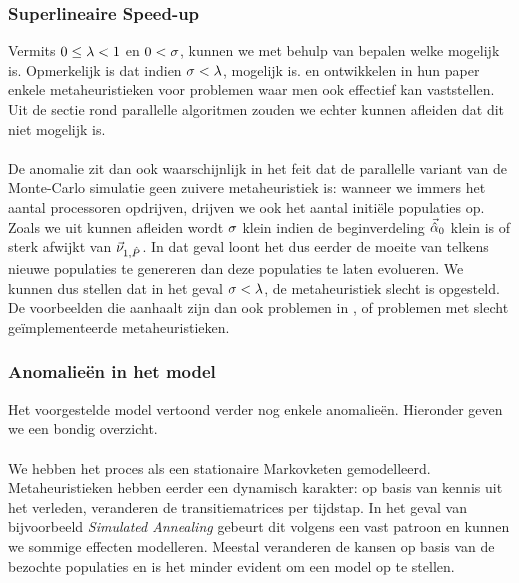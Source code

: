 \subsubsection{Superlineaire Speed-up}

Vermits $0\leq\metapb<1$ en $0<\metapa$, kunnen we met behulp van  bepalen welke \absu{} mogelijk is. Opmerkelijk is dat indien $\metapa<\metapb$, \abslsu{} mogelijk is.  en  ontwikkelen in hun paper\cite{DBLP:journals/jc/ShonkwilerV94} enkele metaheuristieken voor problemen waar men ook effectief \abslsu{} kan vaststellen. Uit de sectie rond parallelle algoritmen zouden we echter kunnen afleiden dat dit niet mogelijk is.

\paragraph{}
De anomalie zit dan ook waarschijnlijk in het feit dat de parallelle variant van de Monte-Carlo simulatie geen zuivere metaheuristiek is: wanneer we immers het aantal processoren opdrijven, drijven we ook het aantal initi\"ele populaties op. Zoals we uit  kunnen afleiden wordt $\metapa$ klein indien de beginverdeling $\probdistnormmeta{0}$ klein is of sterk afwijkt van $\evr[1,\removmat]$. In dat geval loont het dus eerder de moeite van telkens nieuwe populaties te genereren dan deze populaties te laten evolueren. We kunnen dus stellen dat in het geval $\metapa<\metapb$, de metaheuristiek slecht is opgesteld. De voorbeelden die \cite{DBLP:journals/jc/ShonkwilerV94} aanhaalt zijn dan ook problemen in , of problemen met slecht ge\"implementeerde metaheuristieken.

\subsubsection{Anomalie\"en in het model}
Het voorgestelde model vertoond verder nog enkele anomalie\"en. Hieronder geven we een bondig overzicht.

\paragraph{}
We hebben het proces als een stationaire Markovketen gemodelleerd. Metaheuristieken hebben eerder een dynamisch karakter: op basis van kennis uit het verleden, veranderen de transitiematrices per tijdstap. In het geval van bijvoorbeeld \emph{Simulated Annealing} gebeurt dit volgens een vast patroon en kunnen we sommige effecten modelleren\cite{saspeedup}. Meestal veranderen de kansen op basis van de bezochte populaties en is het minder evident om een model op te stellen.

